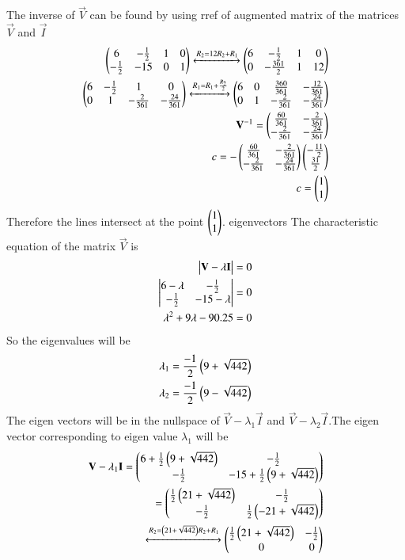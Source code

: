 The inverse of $\vec{V}$ can be found by using rref of augmented matrix of the matrices $\vec{V}$ and $\vec{I}$
\begin{align}
    \begin{pmatrix}6&-\frac{1}{2}&1&0\\-\frac{1}{2}&-15&0&1\end{pmatrix}\xleftrightarrow{R_2=12R_2+R_1}\begin{pmatrix}6&-\frac{1}{2}&1&0\\0&-\frac{361}{2}&1&12\end{pmatrix}\\
    \begin{pmatrix}6&-\frac{1}{2}&1&0\\0&1&-\frac{2}{361}&-\frac{24}{361}\end{pmatrix}\xleftrightarrow{R_1=R_1+\frac{R_2}{2}}\begin{pmatrix}6&0&\frac{360}{361}&-\frac{12}{361}\\0&1&-\frac{2}{361}&-\frac{24}{361}\end{pmatrix}\\
    \mathbf{V}^{-1}=\begin{pmatrix}\frac{60}{361}&-\frac{2}{361}\\-\frac{2}{361}&-\frac{24}{361}\end{pmatrix}\\
    c=-\begin{pmatrix}\frac{60}{361}&-\frac{2}{361}\\-\frac{2}{361}&-\frac{24}{361}\end{pmatrix}\begin{pmatrix}-\frac{11}{2}\\\frac{31}{2}\end{pmatrix}\\
    c=\begin{pmatrix}1\\1\end{pmatrix}
\end{align}
Therefore the lines intersect at the point $\begin{pmatrix}1\\1\end{pmatrix}$.
{eigenvectors}
The characteristic equation of the matrix $\vec{V}$ is
\begin{align}
    \begin{vmatrix}\mathbf{V}-\lambda\mathbf{I}\end{vmatrix}&=0\\
    \begin{vmatrix}6-\lambda&-\frac{1}{2}\\-\frac{1}{2}&-15-\lambda\end{vmatrix}&=0\\
    \lambda^2+9\lambda-90.25&=0
\end{align}
So the eigenvalues will be
\begin{align}
    \lambda_1=\frac{-1}{2}\left(9+\sqrt{442}\right)\\
    \lambda_2=\frac{-1}{2}\left(9-\sqrt{442}\right)
\end{align}
The eigen vectors will be in the nullspace of $\vec{V}-\lambda_1\vec{I}$ and $\vec{V}-\lambda_2\vec{I}$.The eigen vector corresponding to eigen value $\lambda_1$ will be
\begin{align}
    \mathbf{V}-\lambda_1\mathbf{I}=\begin{pmatrix}6+\frac{1}{2}\left(9+\sqrt{442}\right)&-\frac{1}{2}\\-\frac{1}{2}&-15+\frac{1}{2}\left(9+\sqrt{442}\right)\end{pmatrix}\\
    =\begin{pmatrix}\frac{1}{2}\left(21+\sqrt{442}\right)&-\frac{1}{2}\\-\frac{1}{2}&\frac{1}{2}\left(-21+\sqrt{442}\right)\end{pmatrix}\\
    \xleftrightarrow[]{R_2=\ensuremath{\left(21+\sqrt{442}\right)}R_2+R_1}\begin{pmatrix}\frac{1}{2}\left(21+\sqrt{442}\right)&-\frac{1}{2}\\0&0\end{pmatrix}
\end{align}
